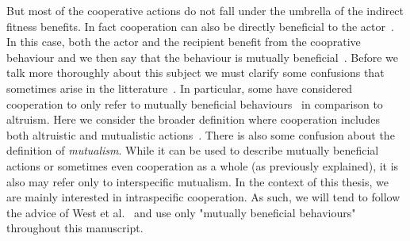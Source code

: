    But most of the cooperative actions do not fall under the umbrella of the indirect fitness benefits. In fact cooperation can also be directly beneficial to the actor~\parencite{Leimar2010}. In this case, both the actor and the recipient benefit from the cooprative behaviour and we then say that the behaviour is mutually beneficial~\parencite{West2007a}. Before we talk more thoroughly about this subject we must clarify some confusions that sometimes arise in the litterature~\parencite{Bergmuller2007a}. In particular, some have considered cooperation to only refer to mutually beneficial behaviours~\parencite{Trivers1985, Lehmann2006} in comparison to altruism. Here we consider the broader definition where cooperation includes both altruistic and mutualistic actions~\parencite{West2007a}. There is also some confusion about the definition of \emph{mutualism}. While it can be used to describe mutually beneficial actions or sometimes even cooperation as a whole (as previously explained), it is also may refer only to interspecific mutualism. In the context of this thesis, we are mainly interested in intraspecific cooperation. As such, we will tend to follow the advice of West et al.~\parencite{West2007} and use only "mutually beneficial behaviours" throughout this manuscript.

